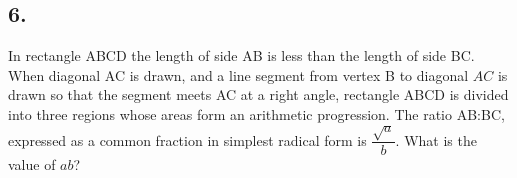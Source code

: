 \documentclass[12pt]{article}
\begin{document}
\begin{answer}
%
\end{answer}



\subsection*{6.}
In rectangle ABCD the length of side AB is less than the length of side BC. When diagonal AC is drawn, and a line segment from vertex B to diagonal $AC$ is drawn so that the segment meets AC at a right angle, rectangle ABCD is divided into three regions whose areas form an arithmetic progression. The ratio AB{:}BC, expressed as a common fraction in simplest radical form is $\dfrac{\sqrt{a}}{b}$. What is the value of $ab$? 

\nopagebreak

\fbox{\phantom{ANSWER}}
\end{document}
